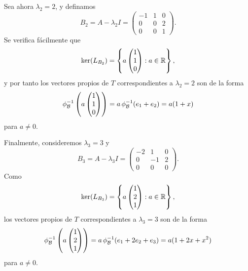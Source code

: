 \documentclass[12pt,a4paper]{book}
\begin{document}
\begin{ejemplo}
        Sea ahora $\lambda_2 = 2$, y definamos
        \begin{equation*}
            B_2 = A - \lambda_2 I = \begin{pmatrix} -1 & 1 & 0 \\ 0 & 0 & 2 \\ 0 & 0 & 1 \end{pmatrix}.
        \end{equation*}
        Se verifica fácilmente que
        \begin{equation*}
            \ker(L_{B_2}) = \left\{ a\begin{pmatrix} 1 \\ 1 \\ 0 \end{pmatrix} : a \in \mathbb{R} \right\},
        \end{equation*}
        y por tanto los vectores propios de $T$ correspondientes a $\lambda_2 = 2$ son de la forma
        \begin{equation*}
            \phi_{\mathcal{B}}^{-1}\left(a\begin{pmatrix} 1\\1\\0\end{pmatrix}\right) = a\, \phi_{\mathcal{B}}^{-1}(e_1+e_2) = a(1+x)
        \end{equation*}
        para $a \neq 0$.

        Finalmente, consideremos $\lambda_3 = 3$ y
        \begin{equation*}
            B_3 = A - \lambda_3 I = \begin{pmatrix} -2 & 1 & 0 \\ 0 & -1 & 2 \\ 0 & 0 & 0 \end{pmatrix}.
        \end{equation*}
        Como
        \begin{equation*}
            \ker(L_{B_3}) = \left\{ a\begin{pmatrix} 1\\2\\1\end{pmatrix} : a \in \mathbb{R} \right\},
        \end{equation*}
        los vectores propios de $T$ correspondientes a $\lambda_3 = 3$ son de la forma
        \begin{equation*}
            \phi_{\mathcal{B}}^{-1}\left(a\begin{pmatrix}1\\2\\1\end{pmatrix}\right) = a\,\phi_{\mathcal{B}}^{-1}(e_1+2e_2+e_3) = a(1+2x+x^2)
        \end{equation*}
        para $a \neq 0$.


\end{ejemplo}
\end{document}
